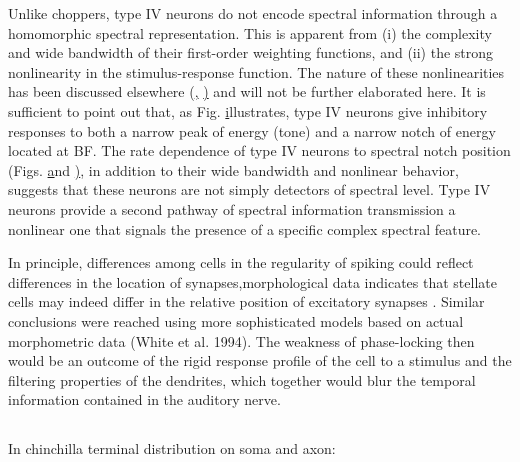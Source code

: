 \documentclass[10pt,a4paper]{article}
\begin{document}
Unlike choppers, type IV neurons do not encode spectral information through a
homomorphic spectral representation. This is apparent from (i) the complexity
and wide bandwidth of their first-order weighting functions, and (ii) the strong
nonlinearity in the stimulus-response function. The nature of these
nonlinearities has been discussed elsewhere
(\href{www.pnas.org/cgi/content/full/97/22/11780#B24},
\href{www.pnas.org/cgi/content/full/97/22/11780#B29})
and will not be further elaborated here. It is sufficient to point out that, as
Fig.
\href{www.pnas.org/cgi/content/full/97/22/11780#F3}
illustrates, type IV neurons give inhibitory responses to both a narrow peak of
energy (tone) and a narrow notch of energy located at BF. The rate dependence of
type IV neurons to spectral notch position (Figs.
\href{www.pnas.org/cgi/content/full/97/22/11780#F3}
and
\href{www.pnas.org/cgi/content/full/97/22/11780#F6}),
in addition to their wide bandwidth and nonlinear behavior, suggests that these
neurons are not simply detectors of spectral level. Type IV neurons provide a
second pathway of spectral information transmission
a nonlinear one that signals the presence of a specific complex spectral
feature.


\citep{Trussell:2002}

In principle, differences among cells in the regularity of spiking could reflect
differences in the location of synapses,morphological data indicates that
stellate cells may indeed differ in the relative position of excitatory synapses
\citep{ SmithRhode:1989}. Similar conclusions were reached using more
sophisticated models based on actual morphometric data (White et al. 1994).  The
weakness of phase-locking then would be an outcome of the rigid response profile
of the cell to a stimulus and the filtering properties of the dendrites, which
together would blur the temporal information contained in the auditory nerve.

\subsection{\citep{JosephsonMorest:1998}}
In chinchilla \citep{JosephsonMorest:1998} terminal distribution on soma and
axon:
\end{document}
